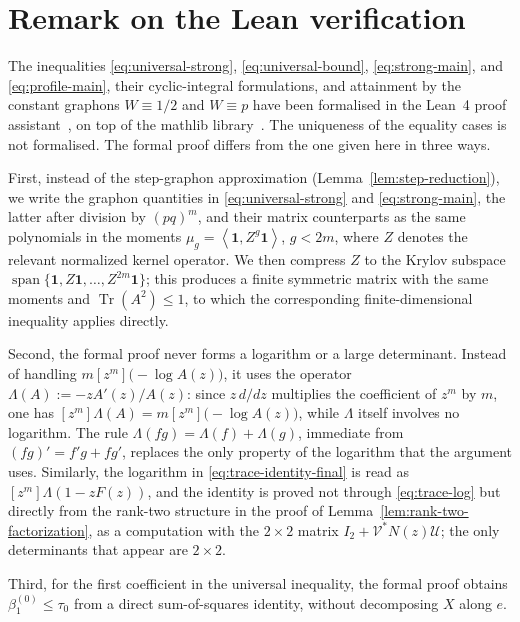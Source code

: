 \documentclass[11pt]{article}
\newcommand{\one}{\mathbf{1}}
\newcommand{\ip}[2]{\left\langle #1,#2\right\rangle}
\newcommand{\Tr}{\operatorname{Tr}}
\begin{document}
\section{Remark on the Lean verification}

The inequalities \eqref{eq:universal-strong}, \eqref{eq:universal-bound},
\eqref{eq:strong-main}, and \eqref{eq:profile-main}, their cyclic-integral formulations, and
attainment by the constant graphons $W\equiv1/2$ and $W\equiv p$ have been formalised in the
Lean~4 proof assistant~\cite{Lean4}, on top of the mathlib library~\cite{mathlib}.  The uniqueness
of the equality cases is not formalised.  The formal proof differs from the one given here in
three ways.

First, instead of the step-graphon approximation (Lemma~\ref{lem:step-reduction}), we write the
graphon quantities in \eqref{eq:universal-strong} and \eqref{eq:strong-main}, the latter after
division by $(pq)^m$, and their matrix counterparts as the same polynomials in the moments
$\mu_g=\ip{\one}{Z^g\one}$, $g<2m$, where $Z$ denotes the relevant normalized kernel operator.
We then compress $Z$ to the Krylov subspace
$\operatorname{span}\{\one,Z\one,\ldots,Z^{2m}\one\}$; this produces a finite symmetric matrix
with the same moments and $\Tr(A^2)\le1$, to which the corresponding finite-dimensional inequality
applies directly.

Second, the formal proof never forms a logarithm or a large determinant.  Instead of handling
$m[z^m]\bigl(-\log A(z)\bigr)$, it uses the operator
$\Lambda(A):=-zA'(z)/A(z)$: since $z\,d/dz$ multiplies the coefficient of $z^m$ by $m$, one has
$[z^m]\Lambda(A)=m[z^m]\bigl(-\log A(z)\bigr)$, while $\Lambda$ itself involves no logarithm.  The
rule $\Lambda(fg)=\Lambda(f)+\Lambda(g)$, immediate from $(fg)'=f'g+fg'$, replaces the only
property of the logarithm that the argument uses.  Similarly, the logarithm in
\eqref{eq:trace-identity-final} is read as $[z^m]\Lambda(1-zF(z))$, and the identity is proved not
through \eqref{eq:trace-log} but directly from the rank-two structure in the proof of
Lemma~\ref{lem:rank-two-factorization}, as a computation with the $2\times2$ matrix
$I_2+\mathcal V^*N(z)\mathcal U$; the only determinants that appear are $2\times2$.

Third, for the first coefficient in the universal inequality, the formal proof obtains
$\beta_1^{(0)}\le\tau_0$ from a direct sum-of-squares identity, without decomposing $X$ along $e$.
\end{document}
